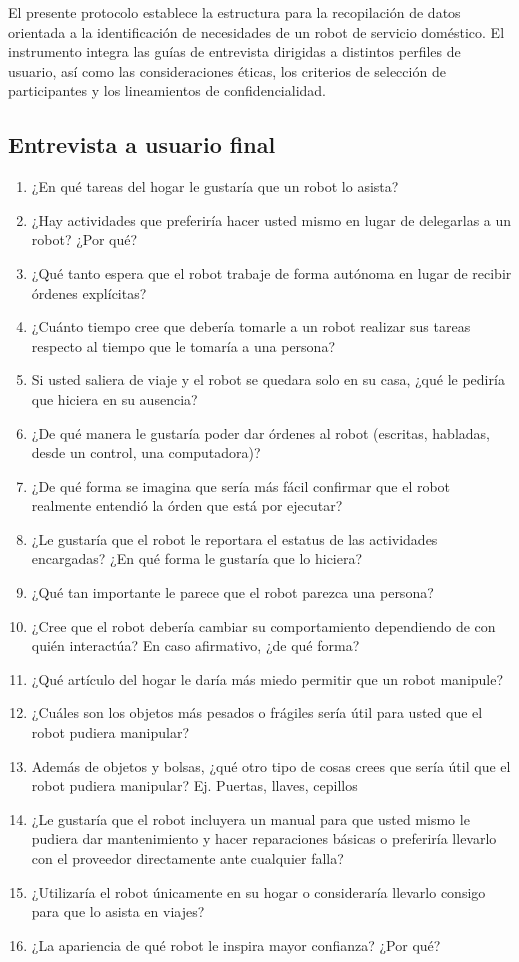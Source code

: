 \label{app:protocolo}

El presente protocolo establece la estructura para la recopilación de datos orientada a la identificación de necesidades de un robot de servicio doméstico. El instrumento integra las guías de entrevista dirigidas a distintos perfiles de usuario, así como las consideraciones éticas, los criterios de selección de participantes y los lineamientos de confidencialidad.

\subsection*{Entrevista a usuario final}

\begin{enumerate}
    \item ¿En qué tareas del hogar le gustaría que un robot lo asista?
    \item ¿Hay actividades que preferiría hacer usted mismo en lugar de delegarlas a un robot? ¿Por qué?
    \item ¿Qué tanto espera que el robot trabaje de forma autónoma en lugar de recibir órdenes explícitas?
    \item ¿Cuánto tiempo cree que debería tomarle a un robot realizar sus tareas respecto al tiempo que le tomaría a una persona?
    \item Si usted saliera de viaje y el robot se quedara solo en su casa, ¿qué le pediría que hiciera en su ausencia?
    \item ¿De qué manera le gustaría poder dar órdenes al robot (escritas, habladas, desde un control, una computadora)?
    \item ¿De qué forma se imagina que sería más fácil confirmar que el robot realmente entendió la órden que está por ejecutar?
    \item ¿Le gustaría que el robot le reportara el estatus de las actividades encargadas? ¿En qué forma le gustaría que lo hiciera?
    \item ¿Qué tan importante le parece que el robot parezca una persona?
    \item ¿Cree que el robot debería cambiar su comportamiento dependiendo de con quién interactúa? En caso afirmativo, ¿de qué forma?
    \item ¿Qué artículo del hogar le daría más miedo permitir que un robot manipule?
    \item ¿Cuáles son los objetos más pesados o frágiles sería útil para usted que el robot pudiera manipular?
    \item Además de objetos y bolsas, ¿qué otro tipo de cosas crees que sería útil que el robot pudiera manipular? Ej. Puertas, llaves, cepillos
    \item ¿Le gustaría que el robot incluyera un manual para que usted mismo le pudiera dar mantenimiento y hacer reparaciones básicas o preferiría llevarlo con el proveedor directamente ante cualquier falla?
    \item ¿Utilizaría el robot únicamente en su hogar o consideraría llevarlo consigo para que lo asista en viajes?
    \item ¿La apariencia de qué robot le inspira mayor confianza? ¿Por qué?
    

\end{enumerate}
